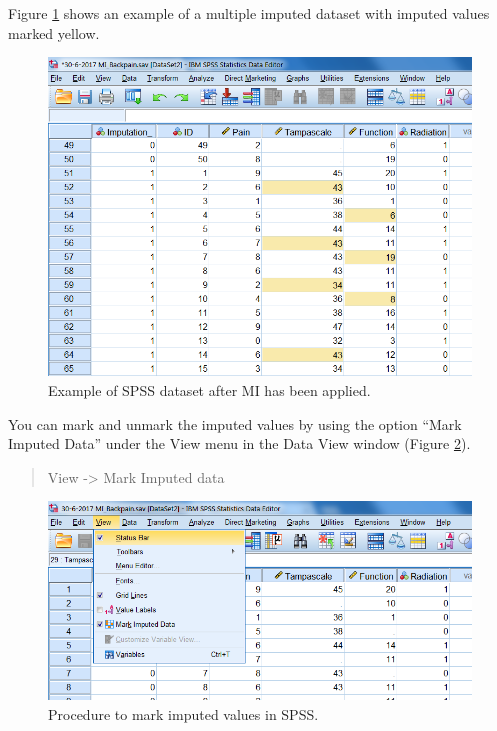 \documentclass[]{book}
\begin{document}
Figure \ref{fig:fig5-1} shows an example of a multiple imputed dataset
with imputed values marked yellow.

\begin{figure}

{\centering \includegraphics[width=0.9\linewidth]{images/fig5.1} 

}

\caption{Example of SPSS dataset after MI has been applied.}\label{fig:fig5-1}
\end{figure}

You can mark and unmark the imputed values by using the option ``Mark
Imputed Data'' under the View menu in the Data View window (Figure
\ref{fig:fig5-2}).

\begin{quote}
View -\textgreater{} Mark Imputed data
\end{quote}

\begin{figure}

{\centering \includegraphics[width=0.9\linewidth]{images/fig5.2} 

}

\caption{Procedure to mark imputed values in SPSS.}\label{fig:fig5-2}
\end{figure}
\end{document}

